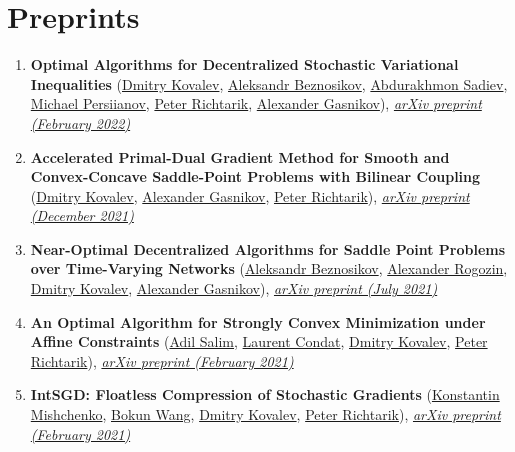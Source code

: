\section{{Preprints}}
\begin{enumerate}
\item \textbf{Optimal Algorithms for Decentralized Stochastic Variational Inequalities} (\href{https://www.dmitry-kovalev.com}{\color{linkcolour}Dmitry Kovalev}, \href{https://anbeznosikov.github.io}{\color{linkcolour}Aleksandr Beznosikov}, \href{https://scholar.google.com/citations?user=R-xZRIAAAAAJ&hl=ru}{\color{linkcolour}Abdurakhmon Sadiev}, \href{}{\color{linkcolour}Michael Persiianov}, \href{https://richtarik.org}{\color{linkcolour}Peter Richtarik}, \href{https://scholar.google.ru/citations?user=AmeE8qkAAAAJ}{\color{linkcolour}Alexander Gasnikov}), \href{https://arxiv.org/abs/2202.02771}{\em \color{black}arXiv preprint (February 2022)}
\item \textbf{Accelerated Primal-Dual Gradient Method for Smooth and Convex-Concave Saddle-Point Problems with Bilinear Coupling} (\href{https://www.dmitry-kovalev.com}{\color{linkcolour}Dmitry Kovalev}, \href{https://scholar.google.ru/citations?user=AmeE8qkAAAAJ}{\color{linkcolour}Alexander Gasnikov}, \href{https://richtarik.org}{\color{linkcolour}Peter Richtarik}), \href{https://arxiv.org/abs/2112.15199}{\em \color{black}arXiv preprint (December 2021)}
\item \textbf{Near-Optimal Decentralized Algorithms for Saddle Point Problems over Time-Varying Networks} (\href{https://anbeznosikov.github.io}{\color{linkcolour}Aleksandr Beznosikov}, \href{https://scholar.google.com/citations?user=sEjyzkgAAAAJ}{\color{linkcolour}Alexander Rogozin}, \href{https://www.dmitry-kovalev.com}{\color{linkcolour}Dmitry Kovalev}, \href{https://scholar.google.ru/citations?user=AmeE8qkAAAAJ}{\color{linkcolour}Alexander Gasnikov}), \href{https://arxiv.org/abs/2107.05957}{\em \color{black}arXiv preprint (July 2021)}
\item \textbf{An Optimal Algorithm for Strongly Convex Minimization under Affine Constraints} (\href{https://adil-salim.github.io}{\color{linkcolour}Adil Salim}, \href{https://lcondat.github.io}{\color{linkcolour}Laurent Condat}, \href{https://www.dmitry-kovalev.com}{\color{linkcolour}Dmitry Kovalev}, \href{https://richtarik.org}{\color{linkcolour}Peter Richtarik}), \href{https://arxiv.org/abs/2102.11079}{\em \color{black}arXiv preprint (February 2021)}
\item \textbf{IntSGD: Floatless Compression of Stochastic Gradients} (\href{https://konstmish.github.io}{\color{linkcolour}Konstantin Mishchenko}, \href{https://bokunwang1.github.io}{\color{linkcolour}Bokun Wang}, \href{https://www.dmitry-kovalev.com}{\color{linkcolour}Dmitry Kovalev}, \href{https://richtarik.org}{\color{linkcolour}Peter Richtarik}), \href{https://arxiv.org/abs/2102.08374}{\em \color{black}arXiv preprint (February 2021)}

\end{enumerate}
